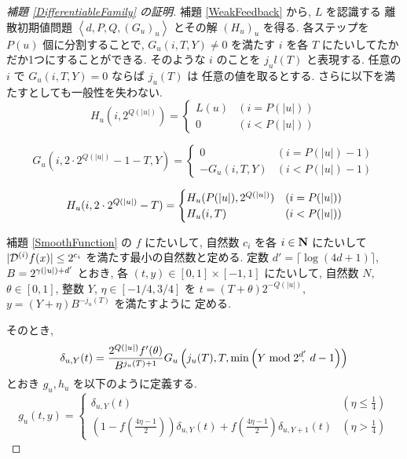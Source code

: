  \begin{proof}[\rm 補題 \ref{DifferentiableFamily} の証明]
  補題 \ref{WeakFeedback} から, $L$ を認識する 
  離散初期値問題 $\left< d, P, Q,(G_u)_u \right>$
  とその解 $(H_u)_u$ を得る.
  各ステップを $P(u)$ 個に分割することで, $G_u(i, T, Y) \not = 0$ を満たす
  $i$ を各 $T$ にたいしてたかだか1つにすることができる. そのような $i$ のことを 
  $j_ul(T)$ と表現する. 任意の $i$ で $G_u(i, T, Y) = 0$ ならば $j_u(T)$ は
  任意の値を取るとする. 
  さらに以下を満たすとしても一般性を失わない.
  \begin{equation}
   H_u(i, 2^{Q(|u|)}) = \begin{cases}
			 L(u) & (i=P(|u|)) \\
			0 & (i<P(|u|))
			\end{cases}
  \end{equation}

 \begin{equation}
  G_u(i, 2\cdot 2^{Q(|u|)} - 1 - T, Y) 
   = \begin{cases}
      0 & (i=P(|u|)-1) \\
      -G_u(i,T,Y) & (i<P(|u|)-1)
     \end{cases}
 \end{equation}

 \begin{equation}
  H_u(i, 2 \cdot 2^{Q(|u|)} - T) 
  = \begin{cases}
    H_u(P(|u|), 2^{Q(|u|)}) & (i={P(|u|)}) \\
    H_u(i, T) &  (i<P(|u|))
    \end{cases}
 \end{equation}

  補題 \ref{SmoothFunction} の $f$ にたいして, 
 自然数 $c_i$ を各 $i \in \mathbf N$ にたいして 
  $|\mathcal D^{(i)}f(x)| \le 2^{c_i}$ を満たす最小の自然数と定める.
 定数 $d' = \lceil \log (4d + 1) \rceil$, 
 $B = 2^{{\gamma(|u|)} + d'}$ とおき, 
 各 $(t, y) \in [0,1] \times [-1, 1]$ にたいして,
 自然数 $N$, $\theta \in [0,1]$, 整数 $Y$, $\eta \in [-1/4, 3/4]$ を
 $t = (T + \theta)2^{-Q(|u|)}$, $y = (Y + \eta)B^{-j_u(T)}$ を満たすように
 定める.
 
 そのとき,
 \begin{equation}
  \delta_{u, Y} (t) = \frac{2^{Q(|u|)} f'(\theta)}{B^{j_u(T)+1}} 
   G_u\left( j_u(T), T, \min \left(Y \bmod 2^{d'}\!\!\!,\ d-1 \right) \right)
 \end{equation}
 とおき $g_u, h_u$ を以下のように定義する.
 \begin{equation}
  g_u(t,y) 
  = \begin{cases}
     \delta_{u, Y}(t)& (\eta \le \frac 1 4) \\
     ( 1-f ( \frac{4\eta-1}{2})) \delta_{u, Y}(t) 
     + f ( \frac{4\eta-1}{2}) \delta_{u,Y+1}(t)
     & (\eta > \frac 1 4)
    \end{cases}
  \label{eq:gu}
 \end{equation}


\end{proof}
